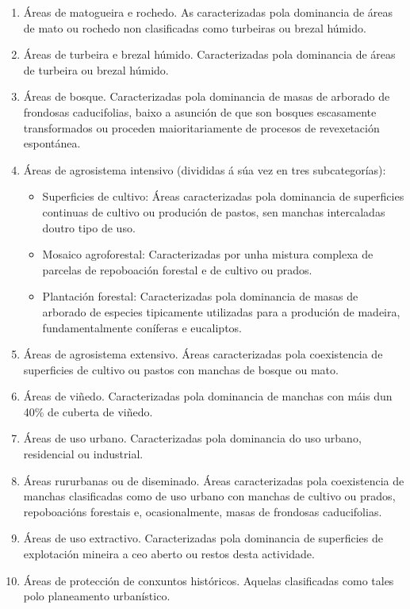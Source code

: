 \documentclass[11pt,a4paper]{article}
\begin{document}
\begin{enumerate}
 \item Áreas de matogueira e rochedo. As caracterizadas pola dominancia de áreas de mato ou rochedo non clasificadas como turbeiras ou brezal húmido.
 \item Áreas de turbeira e brezal húmido. Caracterizadas pola dominancia de áreas de turbeira ou brezal húmido.
 \item Áreas de bosque. Caracterizadas pola dominancia de masas de arborado de frondosas caducifolias, baixo a asunción de que son bosques escasamente transformados ou proceden maioritariamente de procesos de revexetación espontánea.
 \item Áreas de agrosistema intensivo (divididas á súa vez en tres subcategorías):
 \begin{itemize}
  \item Superficies de cultivo: Áreas caracterizadas pola dominancia de superficies continuas de cultivo ou produción de pastos, sen manchas intercaladas doutro tipo de uso.
  \item Mosaico agroforestal: Caracterizadas por unha mistura complexa de parcelas de repoboación forestal e de cultivo ou prados.
  \item Plantación forestal: Caracterizadas pola dominancia de masas de arborado de especies tipicamente utilizadas para a produción de madeira, fundamentalmente coníferas e eucaliptos.
 \end{itemize}
 \item Áreas de agrosistema extensivo. Áreas caracterizadas pola coexistencia de superficies de cultivo ou pastos con manchas de bosque ou mato.
 \item Áreas de viñedo. Caracterizadas pola dominancia de manchas con máis dun 40\% de cuberta de viñedo.
 \item Áreas de uso urbano. Caracterizadas pola dominancia do uso urbano, residencial ou industrial.
 \item Áreas rururbanas ou de diseminado. Áreas caracterizadas pola coexistencia de manchas clasificadas como de uso urbano con manchas de cultivo ou prados, repoboacións forestais e, ocasionalmente, masas de frondosas caducifolias.
 \item Áreas de uso extractivo. Caracterizadas pola dominancia de superficies de explotación mineira a ceo aberto ou restos desta actividade.
 \item Áreas de protección de conxuntos históricos. Aquelas clasificadas como tales polo planeamento urbanístico.
\end{enumerate}
\end{document}
